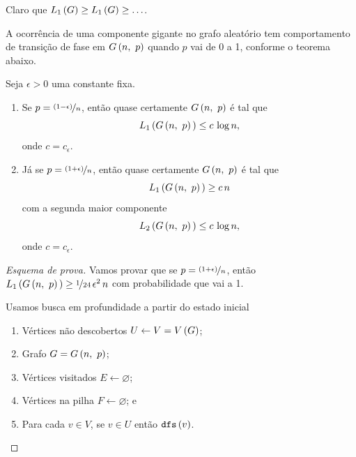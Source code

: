 Claro que $L_1\left(G\vphantom{1j}\right)\geq L_1\left(G\vphantom{1j}\right)\geq\ldots$.

A ocorrência de uma componente gigante no grafo aleatório tem comportamento de transição de fase em $G\left(n,\ p\vphantom{1j}\right)$ quando $p$ vai de 0 a 1, conforme o teorema abaixo.

\begin{teorema}
  Seja $\epsilon>0$ uma constante fixa.
  \begin{enumerate}
    \item Se $p=\nicefrac{\left(1-\epsilon\vphantom{1j}\right)}{n}$, então quase certamente $G\left(n,\ p\vphantom{1j}\right)$ é tal que 
    \[
      L_1\left(G\left(n,\ p\vphantom{1j}\right)\vphantom{1j}\right)\leq c\,\log n,
    \]
    onde $c=c_\epsilon$.
    \item Já se $p=\nicefrac{\left(1+\epsilon\vphantom{1j}\right)}{n}$, então quase certamente $G\left(n,\ p\vphantom{1j}\right)$ é tal que 
    \[
      L_1\left(G\left(n,\ p\vphantom{1j}\right)\vphantom{1j}\right)\geq c\,n
    \]
    com a segunda maior componente
    \[
      L_2\left(G\left(n,\ p\vphantom{1j}\right)\vphantom{1j}\right)\leq c\,\log n,
    \]
    onde $c=c_\epsilon$.
  \end{enumerate}
\end{teorema}

\begin{proof}[Esquema de prova]
  Vamos provar que se $p=\nicefrac{\left(1+\epsilon\vphantom{1j}\right)}{n}$, então $L_1\left(G\left(n,\ p\vphantom{1j}\right)\vphantom{1j}\right)\geq\nicefrac{1}{24}\,\epsilon^2\,n$ com probabilidade que vai a 1.

  Usamos busca em profundidade a partir do estado inicial
  \begin{enumerate}
    \item Vértices não descobertos $U\leftarrow V=V\left(G\vphantom{1j}\right)$;
    \item Grafo $G=G\left(n,\ p\vphantom{1j}\right)$;
    \item Vértices visitados $E\leftarrow\varnothing$;
    \item Vértices na pilha $F\leftarrow\varnothing$; e
    \item Para cada $v\in V$, se $v\in U$ então $\texttt{dfs}\left(v\vphantom{1j}\right)$.
  \end{enumerate}
\end{proof}

